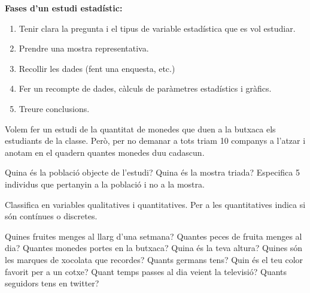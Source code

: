 \begin{theorybox}
 \textbf{Fases d'un estudi estadístic:}
\begin{enumerate} 
	\item Tenir clara la pregunta i el tipus de variable estadística que es vol estudiar.  
	\item Prendre una mostra representativa.
	\item Recollir les dades (fent una enquesta, etc.) 
	\item  Fer un recompte de dades, càlculs de paràmetres estadístics i gràfics.
	\item Treure conclusions.
\end{enumerate} 
\end{theorybox}

\begin{mylist}

\exer Volem fer un estudi de la quantitat de monedes que duen a la butxaca els estudiants de la classe. Però, per no demanar a tots triam 10 companys a l'atzar i anotam en el quadern quantes monedes duu cadascun.

\begin{tasks}
	\task Quina és la població objecte de l'estudi?
	\task Quina és la mostra triada?
	\task Especifica 5 individus que pertanyin a la població i no a la mostra.
\end{tasks}
 
 
\exer \spen Classifica en variables qualitatives i quantitatives. Per a les quantitatives indica si són contínues o discretes.
\begin{tasks}
\task Quines fruites menges al llarg d'una setmana? \dotfill\hspace{1cm}
\task  Quantes peces de fruita menges al dia? \dotfill\hspace{1cm}
\task  Quantes monedes portes en la butxaca? \dotfill\hspace{1cm}
\task  Quina és la teva altura? \dotfill\hspace{1cm}
\task  Quines són les marques de xocolata que recordes? \dotfill\hspace{1cm}
\task  Quants germans tens? \dotfill\hspace{1cm}
\task  Quin és el teu color favorit per a un cotxe? \dotfill\hspace{1cm}
\task  Quant temps passes al dia veient la televisió? \dotfill\hspace{1cm}
\task  Quants seguidors tens en twitter? \dotfill\hspace{1cm}
\end{tasks}
 


\end{mylist}
